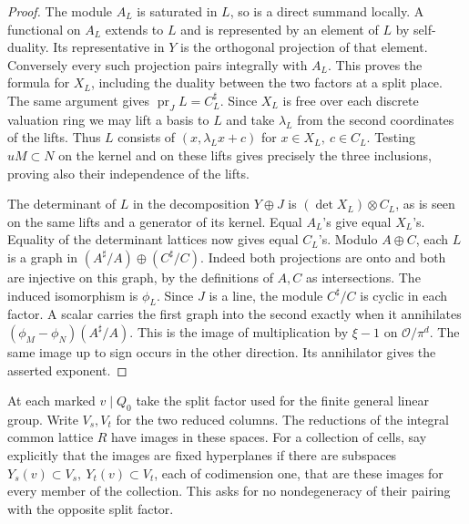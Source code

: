 \documentclass[a4paper,11pt]{article}
\theoremstyle{definition}
\theoremstyle{remark}
\numberwithin{equation}{section}
\begin{document}
\begin{proof}
The module \(A_L\) is saturated in \(L\), so is a direct summand
locally. A functional on \(A_L\) extends to \(L\) and is represented
by an element of \(L\) by self-duality. Its representative in \(Y\)
is the orthogonal projection of that element. Conversely every
such projection pairs integrally with \(A_L\). This proves the
formula for \(X_L\), including the duality between the two factors
at a split place. The same argument gives
\(\operatorname{pr}_J L=C_L^\sharp\). Since \(X_L\) is free over
each discrete valuation ring we may lift a basis to \(L\) and
take \(\lambda_L\) from the second coordinates of the lifts. Thus \(L\)
consists of \((x,\lambda_L x+c)\) for \(x\in X_L,\ c\in C_L\).
Testing \(uM\subset N\) on the kernel and on these lifts gives
precisely the three inclusions, proving also their independence
of the lifts.

The determinant of \(L\) in the decomposition \(Y\oplus J\)
is \((\det X_L)\otimes C_L\), as is seen on the same lifts and a
generator of its kernel. Equal \(A_L\)'s give equal \(X_L\)'s.
Equality of the determinant lattices now gives equal \(C_L\)'s.
Modulo \(A\oplus C\), each \(L\) is a graph in
\((A^\sharp/A)\oplus(C^\sharp/C)\). Indeed both projections
are onto and both are injective on this graph, by the definitions
of \(A,C\) as intersections. The induced isomorphism is \(\phi_L\).
Since \(J\) is a line, the module \(C^\sharp/C\) is cyclic in
each factor. A scalar carries the first graph into the second
exactly when it annihilates \((\phi_M-\phi_N)(A^\sharp/A)\).
This is the image of multiplication by \(\xi-1\) on
\(\mathcal O/\pi^d\). The same image up to sign occurs in the
other direction. Its annihilator gives the asserted exponent.
\end{proof}

At each marked \(v\mid Q_0\) take the split factor used for the
finite general linear group. Write \(V_s,V_t\) for the two
reduced columns. The reductions of the integral common lattice
\(R\) have images in these spaces. For a collection of cells, say
explicitly that the images are fixed hyperplanes if there are
subspaces \(Y_s(v)\subset V_s,\ Y_t(v)\subset V_t\), each of
codimension one, that are these images for every member of the
collection. This asks for no nondegeneracy of their pairing
with the opposite split factor.
\end{document}
